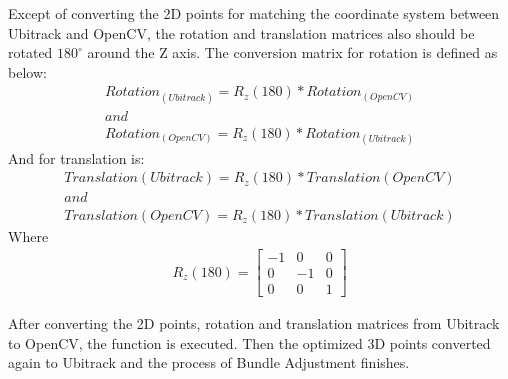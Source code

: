 Except of converting the 2D points for matching the coordinate system between Ubitrack and OpenCV, the rotation and translation matrices also should be rotated $180 ^{\circ}$ around the Z axis. The conversion matrix for rotation is defined as below:
\begin{gather*}
	Rotation_{(Ubitrack)} = R_{z}(180) * Rotation_{(OpenCV)}\\
	and\\
    Rotation_{(OpenCV)} = R_{z}(180) * Rotation_{(Ubitrack)}
\end{gather*}
And for translation is:
\begin{gather*}
	Translation{(Ubitrack)} = R_{z}(180) * Translation{(OpenCV)}\\
	and\\
    Translation{(OpenCV)} = R_{z}(180) * Translation{(Ubitrack)}
\end{gather*}
Where 
\begin{gather*}
	R_{z}(180) = \begin{bmatrix}
       -1 & 0 & 0   \\[0.3em]
       0 & -1 & 0   \\[0.3em]
       0  & 0 & 1
     \end{bmatrix}
\end{gather*}

After converting the 2D points, rotation and translation matrices from Ubitrack to OpenCV, the  function is executed. Then the optimized 3D points converted again to Ubitrack and the process of Bundle Adjustment finishes.


